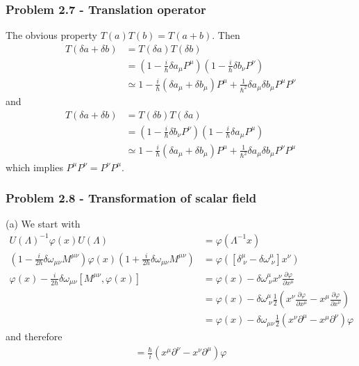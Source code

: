 \documentclass[10pt,a4paper]{article}
\theoremstyle{definition}
\begin{document}
\subsubsection{Problem 2.7 - Translation operator}
The obvious property $T(a)T(b)=T(a+b)$. Then
\begin{align}
T(\delta a+\delta b)&=T(\delta a)T(\delta b)\\
&=\left(1-\frac{i}{\hbar}\delta a_\mu P^\mu\right)\left(1-\frac{i}{\hbar}\delta b_\nu P^\nu\right)\\
&\simeq 1-\frac{i}{\hbar}(\delta a_\mu +\delta b_\mu) P^\mu+\frac{1}{\hbar^2}\delta a_\mu\delta b_\mu P^\mu P^\nu
\end{align}
and 
\begin{align}
T(\delta a+\delta b)&=T(\delta b)T(\delta a)\\
&=\left(1-\frac{i}{\hbar}\delta b_\nu P^\nu\right)\left(1-\frac{i}{\hbar}\delta a_\mu P^\mu\right)\\
&\simeq 1-\frac{i}{\hbar}(\delta a_\mu +\delta b_\mu) P^\mu+\frac{1}{\hbar^2}\delta a_\mu\delta b_\mu P^\nu P^\mu
\end{align}
which implies $P^\mu P^\nu=P^\nu P^\mu$.

\subsubsection{Problem 2.8 - Transformation of scalar field}
(a) We start with
\begin{align}
U(\Lambda)^{-1}\varphi(x)U(\Lambda)&=\varphi(\Lambda^{-1}x)\\
\left(1-\frac{i}{2\hbar}\delta\omega_{\mu\nu}M^{\mu\nu}\right)\varphi(x)\left(1+\frac{i}{2\hbar}\delta\omega_{\mu\nu}M^{\mu\nu}\right)&=\varphi([\delta^\mu_{\;\nu}-\delta\omega^\mu_{\;\nu}]x^\nu)\\
\varphi(x)-\frac{i}{2\hbar}\delta\omega_{\mu\nu}[M^{\mu\nu},\varphi(x)]&=\varphi(x)-\delta\omega^\mu_{\;\nu}x^\nu\frac{\partial\varphi}{\partial x^\mu}\\
&=\varphi(x)-\delta\omega^\mu_{\;\nu}\frac{1}{2}\left(x^\nu\frac{\partial\varphi}{\partial x^\mu}-x^\mu\frac{\partial\varphi}{\partial x^\nu}\right)\\
&=\varphi(x)-\delta\omega_{\mu\nu}\frac{1}{2}\left(x^\nu\partial^\mu-x^\mu\partial^\nu\right)\varphi
\end{align}
and therefore
\begin{align}
[\varphi,M^{\mu\nu}]=\frac{\hbar}{i}(x^\mu\partial^\nu-x^\nu\partial^\mu)\varphi
\end{align}
\end{document}
